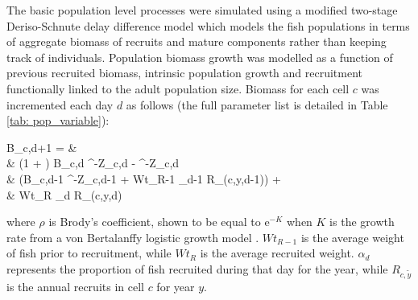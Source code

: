 \documentclass[review]{elsarticle}
\let\oldequation\equation
\let\oldendequation\endequation
\renewenvironment{equation}
 {\linenomathNonumbers\oldequation}
 {\oldendequation\endlinenomath}
\begin{document}
The basic population level processes were simulated using a modified two-stage
Deriso-Schnute delay difference model which models the fish populations in
terms of aggregate biomass of recruits and mature components rather than
keeping track of individuals\citep{Deriso1980, Schnute1985, Dichmont2003}.
 Population biomass growth was
modelled as a function of previous recruited biomass, intrinsic population
growth and recruitment functionally linked to the adult population size.
Biomass for each cell $c$ was incremented each day $d$ as follows (the full
parameter list is detailed in Table \ref{tab: pop_variable}): 
\begin{equation}
	\begin{split}
	B_{c,d+1} = &\\
	& (1 + \rho) B_{c,d} \cdot {}^{-Z_{c,d}} - \rho \cdot
	^{-Z_{c,d}} \hspace{2.9cm}
	\times \\  
	& (B_{c,d-1} \cdot {}^{-Z_{c,d-1}} + Wt_{R-1} \cdot \alpha_{d-1} \cdot
	R_{(c,y,d-1)})
	\hspace{0.4cm} + \\
	& Wt_{R} \cdot \alpha_{d} \cdot R_{(c,y,d)} 
	\end{split}
\end{equation}
where $\rho$ is Brody's coefficient, shown to be equal to $\mathrm{e}^{-K}$ when $K$ is
the growth rate from a von Bertalanffy logistic growth model
\citep{Schnute1985}. $Wt_{R-1}$ is the average weight of fish prior to
recruitment, while $Wt_{R}$ is the average recruited weight. $\alpha_{d}$
represents the proportion of fish recruited during that day for the year, while
$R_{c,\tilde{y}}$ is the annual recruits in cell $c$ for year $y$. \\
\end{document}
